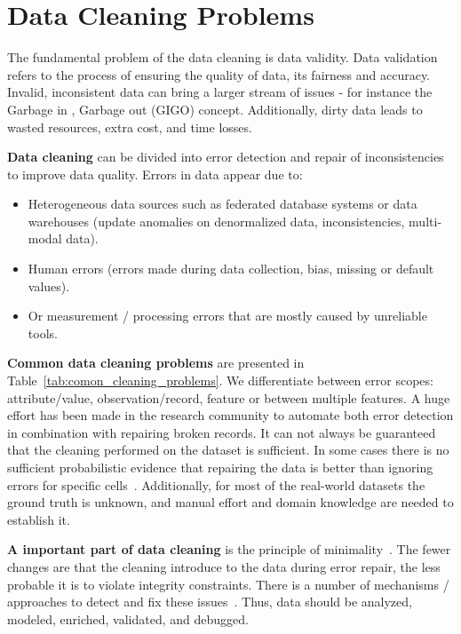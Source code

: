 
\section{Data Cleaning Problems}
\label{sec:data_cleaning_problems}

The fundamental problem of the data cleaning is data validity.
Data validation refers to the process of ensuring the quality of data, its fairness and accuracy. 
Invalid, inconsistent data can bring a larger stream of issues - for instance the Garbage in , Garbage out (GIGO) concept.
Additionally, dirty data leads to wasted resources, extra cost, and time losses.

\textbf{Data cleaning} can be divided into error detection and repair of inconsistencies to improve data quality.
Errors in data appear due to:

\begin{itemize}
    \item Heterogeneous data sources such as federated database systems or
    data warehouses (update anomalies on denormalized data, inconsistencies, multi-modal data).
    \item Human errors (errors made during data collection, bias, missing or default values).
    \item Or measurement / processing errors that are mostly caused by unreliable tools.
\end{itemize}

\textbf{Common data cleaning problems} are presented in Table~\ref{tab:comon_cleaning_problems}.
We differentiate between error scopes: attribute/value, observation/record, feature or between multiple features. 
A huge effort has been made in the research community to automate both error detection in combination with  repairing broken records. 
It can not always be guaranteed that the cleaning performed on the dataset is sufficient.
In some cases there is no sufficient probabilistic evidence that repairing the data is better than ignoring errors for specific cells~\cite{RekatsinasCIR2017}. 
Additionally, for most of the real-world datasets the ground truth is unknown, and manual effort and domain knowledge are needed to establish it.

\textbf{A important part of data cleaning} is the principle of minimality~\cite{minimality, RekatsinasCIR2017}.
The fewer changes are that the cleaning introduce to the data during error repair, the less probable it is to violate integrity constraints.
There is a number of mechanisms / approaches to detect and fix these issues~\cite{data_cleaning_methods}.
Thus, data should be analyzed, modeled, enriched, validated, and debugged.

